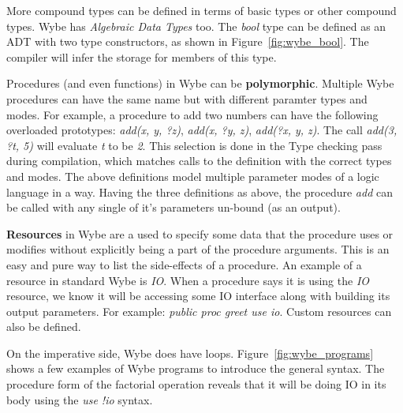 More compound types can be defined in terms of basic types or other compound
types. Wybe has \textit{Algebraic Data Types} too. The \textit{bool} type can
be defined as an ADT with two type constructors, as shown in
Figure~\ref{fig:wybe_bool}. The compiler will infer the storage for members of
this type. 

Procedures (and even functions) in Wybe can be \textbf{polymorphic}. Multiple
Wybe procedures can have the same name but with different paramter types and
modes. For example, a procedure to add two numbers can have the following
overloaded prototypes: \textit{add(x, y, ?z)}, \textit{add(x, ?y, z)},
\textit{add(?x, y, z)}. The call \textit{add(3, ?t, 5)} will evaluate
\textit{t} to be \textit{2}. This selection is done in the Type checking pass
during compilation, which matches calls to the definition with the correct
types and modes. The above definitions model multiple parameter modes of a
logic language in a way. Having the three definitions as above, the procedure
\textit{add} can be called with any single of it's parameters un-bound (as an
output).

\textbf{Resources} in Wybe are a used to specify some data that the procedure
uses or modifies without explicitly being a part of the procedure
arguments. This is an easy and pure way to list the side-effects of a
procedure. An example of a resource in standard Wybe is \textit{IO}. When a
procedure says it is using the \textit{IO} resource, we know it will be
accessing some IO interface along with building its output parameters. For
example: \textit{public proc greet use io}. Custom resources can also be
defined.



On the imperative side, Wybe does have loops. Figure~\ref{fig:wybe_programs}
shows a few examples of Wybe programs to introduce the general syntax. The
procedure form of the factorial operation reveals that it will be doing IO in
its body using the \textit{use !io} syntax. 




